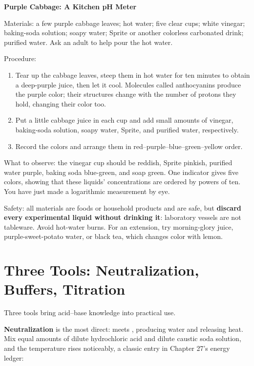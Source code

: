\begin{shiyan}
\textbf{Purple Cabbage: A Kitchen pH Meter}

Materials: a few purple cabbage leaves; hot water; five clear cups; white vinegar; baking-soda solution; soapy water; Sprite or another colorless carbonated drink; purified water. Ask an adult to help pour the hot water.

Procedure:
\begin{enumerate}[itemsep=1pt]
\item Tear up the cabbage leaves, steep them in hot water for ten minutes to obtain a deep-purple juice, then let it cool. Molecules called anthocyanins produce the purple color; their structures change with the number of protons they hold, changing their color too.
\item Put a little cabbage juice in each cup and add small amounts of vinegar, baking-soda solution, soapy water, Sprite, and purified water, respectively.
\item Record the colors and arrange them in red--purple--blue--green--yellow order.
\end{enumerate}

What to observe: the vinegar cup should be reddish, Sprite pinkish, purified water purple, baking soda blue-green, and soap green. One indicator gives five colors, showing that these liquids'  concentrations are ordered by powers of ten. You have just made a logarithmic measurement by eye.

Safety: all materials are foods or household products and are safe, but \textbf{discard every experimental liquid without drinking it}: laboratory vessels are not tableware. Avoid hot-water burns. For an extension, try morning-glory juice, purple-sweet-potato water, or black tea, which changes color with lemon.
\end{shiyan}

\section{Three Tools: Neutralization, Buffers, Titration}

Three tools bring acid--base knowledge into practical use.

\textbf{Neutralization} is the most direct:  meets , producing water and releasing heat. Mix equal amounts of dilute hydrochloric acid and dilute caustic soda solution, and the temperature rises noticeably, a classic entry in Chapter 27's energy ledger:


